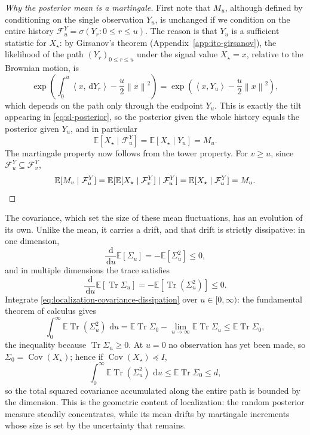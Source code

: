 \documentclass[10pt,a4paper]{amsart}
\numberwithin{equation}{section}
\DeclareMathOperator{\Cov}{Cov}
\DeclareMathOperator{\Tr}{Tr}
\newcommand{\E}{\mathbb{E}}
\newcommand{\dd}{\,\mathrm{d}}
\newcommand{\Id}{I}
\newcommand{\cF}{\mathcal{F}}
\newcommand{\norm}[1]{\left\lVert #1 \right\rVert}
\newcommand{\ip}[2]{\left\langle #1,#2 \right\rangle}
\begin{document}
\begin{proof}[Why the posterior mean is a martingale]
First note that $M_u$, although defined by conditioning on the single
observation $Y_u$, is unchanged if we condition on the entire history
$\cF_u^Y=\sigma(Y_r:0\leq r\leq u)$.  The reason is that $Y_u$ is a sufficient
statistic for $X_\star$: by Girsanov's theorem
(Appendix~\ref{app:ito-girsanov}), the likelihood of the path
$(Y_r)_{0\leq r\leq u}$ under the signal value $X_\star=x$, relative to the Brownian motion, is
\[
    \exp\!\left(\int_0^u\ip{x}{\dd Y_r}-\frac{u}{2}\norm{x}^2\right)
    =
    \exp\!\left(\ip{x}{Y_u}-\frac{u}{2}\norm{x}^2\right),
\]
which depends on the path only through the endpoint $Y_u$.  This is exactly the
tilt appearing in \eqref{eq:sl-posterior}, so the posterior given the whole
history equals the posterior given $Y_u$, and in particular
\[
    \E[X_\star\mid\cF_u^Y]=\E[X_\star\mid Y_u]=M_u.
\]
The martingale property now follows from the tower property.  For $v\geq u$,
since $\cF_u^Y\subseteq\cF_v^Y$,
\[
    \E[M_v\mid \cF_u^Y]
    =
    \E[\E[X_\star\mid \cF_v^Y]\mid \cF_u^Y]
    =
    \E[X_\star\mid \cF_u^Y]
    =
    M_u. \qedhere
\]
\end{proof}

The covariance, which set the size of these mean fluctuations, has an evolution
of its own.  Unlike the mean, it carries a drift, and that drift is strictly
dissipative: in one dimension,
\[
    \frac{\dd}{\dd u}\E[\Sigma_u]=-\E[\Sigma_u^2]\leq0,
\]
and in multiple dimensions the trace satisfies
\begin{equation}\label{eq:localization-covariance-dissipation}
    \frac{\dd}{\dd u}\E[\Tr\Sigma_u]
    =
    -\E[\Tr(\Sigma_u^2)]\leq0.
\end{equation}
Integrate \eqref{eq:localization-covariance-dissipation} over
$u\in[0,\infty)$: the fundamental theorem of calculus gives
\[
    \int_0^\infty\E\Tr(\Sigma_u^2)\,\dd u
    =
    \E\Tr\Sigma_0-\lim_{u\to\infty}\E\Tr\Sigma_u
    \leq
    \E\Tr\Sigma_0,
\]
the inequality because $\Tr\Sigma_u\geq0$.  At $u=0$ no observation has yet been
made, so $\Sigma_0=\Cov(X_\star)$; hence if $\Cov(X_\star)\preceq\Id$,
\begin{equation}\label{eq:localization-hessian-budget}
    \int_0^\infty
    \E\Tr(\Sigma_u^2)\,\dd u
    \leq
    \E\Tr\Sigma_0
    \leq d,
\end{equation}
so the total squared covariance accumulated along the entire path is bounded by
the dimension.  This is the geometric content of localization: the random
posterior measure steadily concentrates, while its mean drifts by martingale
increments whose size is set by the uncertainty that remains.
\end{document}
